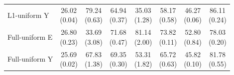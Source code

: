 \begin{table}[t]
\begin{tabular}{@{}lccccccc@{}}
L1-uniform Y & \shortstack{26.02\\{\scriptsize (0.04)}} & \shortstack{79.24\\{\scriptsize (0.63)}} & \shortstack{64.94\\{\scriptsize (0.37)}} & \shortstack{35.03\\{\scriptsize (1.28)}} & \shortstack{58.17\\{\scriptsize (0.58)}} & \shortstack{46.27\\{\scriptsize (0.06)}} & \shortstack{86.11\\{\scriptsize (0.24)}}\\
Full-uniform E & \shortstack{26.80\\{\scriptsize (0.23)}} & \shortstack{33.69\\{\scriptsize (3.08)}} & \shortstack{71.68\\{\scriptsize (0.47)}} & \shortstack{81.14\\{\scriptsize (2.00)}} & \shortstack{73.82\\{\scriptsize (0.11)}} & \shortstack{52.80\\{\scriptsize (0.84)}} & \shortstack{78.03\\{\scriptsize (0.20)}}\\
Full-uniform Y & \shortstack{25.69\\{\scriptsize (0.02)}} & \shortstack{67.83\\{\scriptsize (1.38)}} & \shortstack{69.35\\{\scriptsize (0.30)}} & \shortstack{53.31\\{\scriptsize (1.82)}} & \shortstack{65.72\\{\scriptsize (0.63)}} & \shortstack{45.82\\{\scriptsize (0.10)}} & \shortstack{81.78\\{\scriptsize (0.55)}}\\
\bottomrule\end{tabular}
\end{table}
